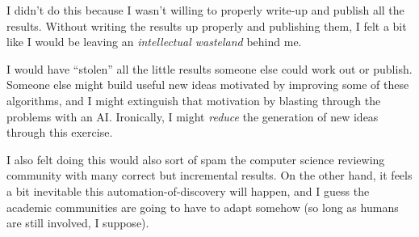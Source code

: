 \documentclass[11pt]{article}
\begin{document}
I didn't do this because I wasn't willing to properly write-up and publish all the results. Without writing the results up properly and publishing them, I felt a bit like I would be leaving an \textit{intellectual wasteland} behind me.

I would have ``stolen'' all the little results someone else could work out or publish. Someone else might build useful new ideas motivated by improving some of these algorithms, and I might extinguish that motivation by blasting through the problems
with an AI. Ironically, I might \textit{reduce} the generation of new ideas through this exercise.

I also felt doing this would also sort of spam the computer science reviewing community with many correct but incremental results. On the other hand, it feels a bit inevitable this automation-of-discovery will happen, and I guess the academic communities are going to have
to adapt somehow (so long as humans are still involved, I suppose).
\end{document}
